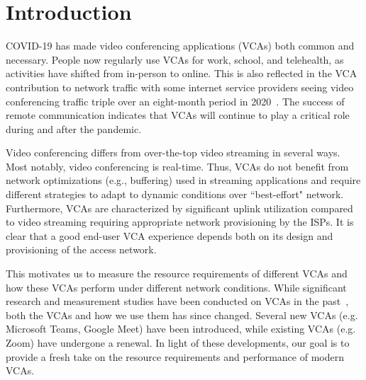 \section{Introduction}\label{sec:intro}
COVID-19 has made video conferencing applications (VCAs) both common and necessary. People now regularly use VCAs for work, school, and telehealth, as activities have shifted from in-person to online. This is also reflected in the VCA contribution to network traffic with some internet service providers seeing video conferencing traffic triple over an eight-month period in 2020~\cite{bitag_report}. The success of remote communication indicates that VCAs will continue to play a critical role during and after the pandemic. 



Video conferencing differs from over-the-top video streaming in several ways. Most notably, video conferencing is real-time. Thus, VCAs do not benefit from network optimizations (e.g., buffering) used in streaming applications and require different strategies to adapt to dynamic conditions over ``best-effort" network. Furthermore, VCAs are characterized by significant uplink utilization compared to video streaming requiring appropriate network provisioning by the ISPs. It is clear that a good end-user VCA experience depends both on its design and provisioning of the access network.   %

This motivates us to measure the resource requirements of different VCAs and how these VCAs perform under different network conditions. 
While significant research and measurement studies have been conducted on VCAs in the past~\cite{guha2005experimental, baset2004analysis, bonfiglio2008detailed, bonfiglio2008tracking, xu2012video}, both the VCAs and how we use them has since changed. Several new VCAs (e.g. Microsoft Teams, Google Meet) have been introduced, while existing VCAs (e.g. Zoom) have undergone a renewal. In light of these developments, our goal is to provide a fresh take on the resource requirements and performance of modern VCAs. 


